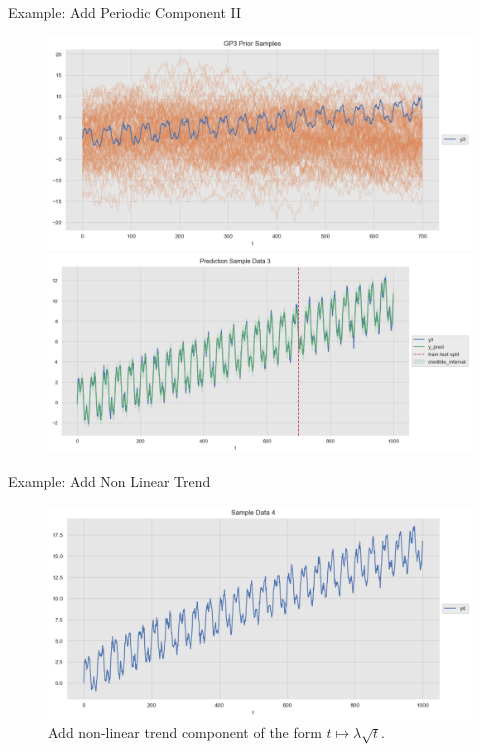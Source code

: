 \documentclass[10pt]{beamer}
\begin{document}
\begin{frame}{Example: Add Periodic Component II }
\begin{center}
\begin{figure}
\includegraphics[scale=0.30]{images/gaussian_process_time_series_files/gaussian_process_time_series_63_0.png}
\includegraphics[scale=0.30]{images/gaussian_process_time_series_files/gaussian_process_time_series_68_0.png}
\end{figure}
\end{center}
\end{frame}

\begin{frame}{Example: Add Non Linear Trend}
\begin{center}
\begin{figure}
\includegraphics[scale=0.4]{images/gaussian_process_time_series_files/gaussian_process_time_series_76_0.png} 
\caption{Add non-linear trend component of the form $t\longmapsto \lambda\sqrt{t}$.}
\end{figure}
\end{center}
\end{frame}
\end{document}
